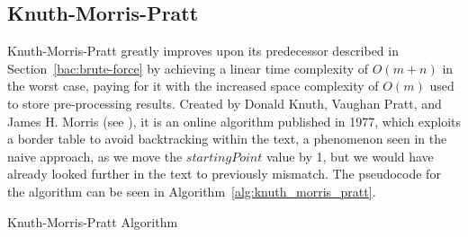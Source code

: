 \subsection{Knuth-Morris-Pratt}

Knuth-Morris-Pratt greatly improves upon its predecessor described in Section~\ref{bac:brute-force} by achieving a linear time complexity of $O(m+n)$ in the worst case, paying for it with the increased space complexity of  $O(m)$ used to store pre-processing results. Created by Donald Knuth, Vaughan Pratt, and James H. Morris (see \cite{KMP}), it is an online algorithm published in 1977, which exploits a border table to avoid backtracking within the text, a phenomenon seen in the naive approach, as we move the $startingPoint$ value by 1, but we would have already looked further in the text to previously mismatch.  The pseudocode for the algorithm can be seen in Algorithm~\ref{alg:knuth_morris_pratt}.


\begin{algorithm}[H]
    \DontPrintSemicolon

\caption{Knuth-Morris-Pratt Algorithm}
\label{alg:knuth_morris_pratt}
\end{algorithm}


